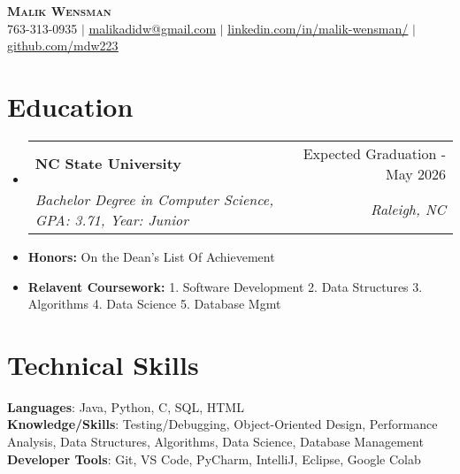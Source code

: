 \documentclass[letterpaper,11pt]{article}
\makeatletter
\newcommand{\resumeItem}[1]{
  \item\small{
    {#1 \vspace{-2pt}}
  }
}
\newcommand{\resumeSubheading}[4]{
  \vspace{-2pt}\item
    \begin{tabular*}{0.97\textwidth}[t]{l@{\extracolsep{\fill}}r}
      \textbf{#1} & #2 \\
      \textit{\small#3} & \textit{\small #4} \\
    \end{tabular*}\vspace{-7pt}
}
\newcommand{\resumeSubHeadingListStart}{\begin{itemize}[leftmargin=0.15in, label={}]}
\newcommand{\resumeSubHeadingListEnd}{\end{itemize}}
\makeatother
\begin{document}

\begin{center}
    \textbf{\Huge \scshape Malik Wensman} \\ \vspace{1pt}
    \small 763-313-0935 $|$ \href{mailto:malikadidw@gmail.com}{\underline{malikadidw@gmail.com}} $|$ 
    \href{https://www.linkedin.com/in/malik-wensman/}{\underline{linkedin.com/in/malik-wensman/}} $|$
    \href{https://github.com/mdw223}{\underline{github.com/mdw223}}
\end{center}


\section{Education}
  \resumeSubHeadingListStart
    \resumeSubheading
      {NC State University}{Expected Graduation - May 2026}
      {Bachelor Degree in Computer Science, GPA: 3.71, Year: Junior}{Raleigh, NC}
      \resumeItem{\textbf{Honors:} On the Dean's List Of Achievement}
      \resumeItem{\textbf{Relavent Coursework:} 1. Software Development 2. Data Structures 3. Algorithms 4. Data Science 5. Database Mgmt}
  \resumeSubHeadingListEnd

\section{Technical Skills}
 \begin{itemize}[leftmargin=0.15in, label={}]
    \small{\item{
     \textbf{Languages}{: Java, Python, C, SQL, HTML} \\
     \textbf{Knowledge/Skills}{: Testing/Debugging, Object-Oriented Design, Performance Analysis, Data Structures, Algorithms, Data Science, Database Management} \\
     \textbf{Developer Tools}{: Git, VS Code, PyCharm, IntelliJ, Eclipse, Google Colab} \\
    }}
 \end{itemize}
 
\end{document}
